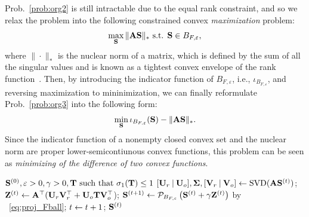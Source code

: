 \documentclass[10pt,journal]{IEEEtran}
\theoremstyle{plain}
\begin{document}
Prob.~\eqref{prob:org2} is still intractable due to the equal rank constraint, and so we relax the problem into the following constrained convex \textit{maximization} problem:
\begin{align}\label{prob:org3}
    \max_{\mathbf{S}} \|\mathbf{A}\mathbf{S}\|_* \mbox{ s.t. }
    \mathbf{S}\in B_{F,\varepsilon},
\end{align}
where $\|\cdot\|_*$ is the nuclear norm of a matrix, which is defined by the sum of all the singular values and is known as a tightest convex envelope of the rank function~\cite{fazel2002matrix}.
Then, by introducing the indicator function of $B_{F,\varepsilon}$, i.e., $\iota_{B_{F,\varepsilon}}$, and reversing maximization to mininimization, we can finally reformulate Prob.~\eqref{prob:org3} into the following form:
\begin{align}\label{prob:prop}
    \min_{\mathbf{S}} \iota_{B_{F,\varepsilon}}(\mathbf{S}) - \|\mathbf{A}\mathbf{S}\|_*.
\end{align}
Since the indicator function of a nonempty closed convex set and the nuclear norm are proper lower-semicontiunous convex functions, this problem can be seen as \textit{minimizing of the difference of two convex functions}.

\begin{algorithm}[H]
    \caption{Proposed sampling operator Design Algorithm}
    \label{algo:PLDC}
    \begin{algorithmic}[1]
    \renewcommand{\algorithmicrequire}{\textbf{Input:}}
    \renewcommand{\algorithmicensure}{\textbf{Output:}}
    \REQUIRE $ \mathbf{S}^{(0)}, \varepsilon>0, \gamma>0, \mathbf{T} \mbox{ such that }\sigma_{1}(\mathbf{T}) \leq 1$
    \STATE $[\mathbf{U}_{r}\:|\:\mathbf{U}_{o}], \mathbf{\Sigma}, [\mathbf{V}_{r}\:|\:\mathbf{V}_{o}] \leftarrow \mathrm{SVD}(\mathbf{A}\mathbf{S}^{(t)})$;
    \STATE $ \mathbf{Z}^{(t)} \leftarrow \mathbf{A}^{\top} (\mathbf{U}_{r}\mathbf{V}_{r}^{\top} + \mathbf{U}_{o}\mathbf{T}\mathbf{V}_{o}^{\top}$);
    \STATE $ \mathbf{S}^{(t+1)} \leftarrow \mathcal{P}_{B_{F,\varepsilon}}\left( \mathbf{S}^{(t)} + \gamma \mathbf{Z}^{(t)}\right)$ by ~\eqref{eq:proj_Fball};
    \STATE $ t \leftarrow t+1 $;
    \ENDWHILE
    \ENSURE $\mathbf{S}^{(t)}$
    \end{algorithmic}
\end{algorithm}
\vspace{-0.5cm}
\end{document}
